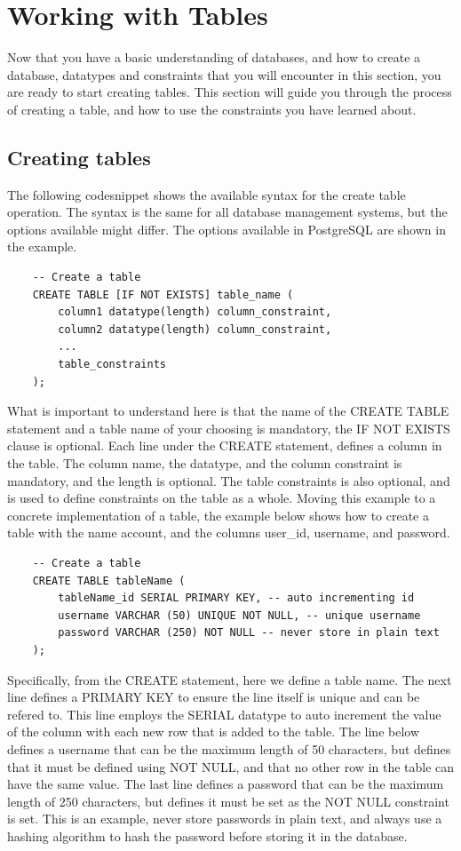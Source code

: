 \section{Working with Tables}
Now that you have a basic understanding of databases, and how to create a database, datatypes and constraints that you will encounter in this section, you are ready to start creating tables. This section will guide you through the process of creating a table, and how to use the constraints you have learned about.

\subsection{Creating tables}
The following codesnippet shows the available syntax for the create table operation. The syntax is the same for all database management systems, but the options available might differ. The options available in PostgreSQL are shown in the example.

\begin{verbatim}
    -- Create a table
    CREATE TABLE [IF NOT EXISTS] table_name (
        column1 datatype(length) column_constraint,
        column2 datatype(length) column_constraint,
        ...
        table_constraints
    );
\end{verbatim}

What is important to understand here is that the name of the CREATE TABLE statement and a table name of your choosing is mandatory, the IF NOT EXISTS clause is optional. Each line under the CREATE statement, defines a column in the table. The column name, the datatype, and the column constraint is mandatory, and the length is optional. The table constraints is also optional, and is used to define constraints on the table as a whole. Moving this example to a concrete implementation of a table, the example below shows how to create a table with the name account, and the columns user\_id, username, and password.

\begin{verbatim}
    -- Create a table
    CREATE TABLE tableName (
        tableName_id SERIAL PRIMARY KEY, -- auto incrementing id
        username VARCHAR (50) UNIQUE NOT NULL, -- unique username
        password VARCHAR (250) NOT NULL -- never store in plain text
    );
\end{verbatim}

Specifically, from the CREATE statement, here we define a table name. The next line defines a PRIMARY KEY to ensure the line itself is unique and can be refered to. This line employs the SERIAL datatype to auto increment the value of the column with each new row that is added to the table. The line below defines a username that can be the maximum length of 50 characters, but defines that it must be defined using NOT NULL, and that no other row in the table can have the same value. The last line defines a password that can be the maximum length of 250 characters, but defines it must be set as the NOT NULL constraint is set. This is an example, never store passwords in plain text, and always use a hashing algorithm to hash the password before storing it in the database.

